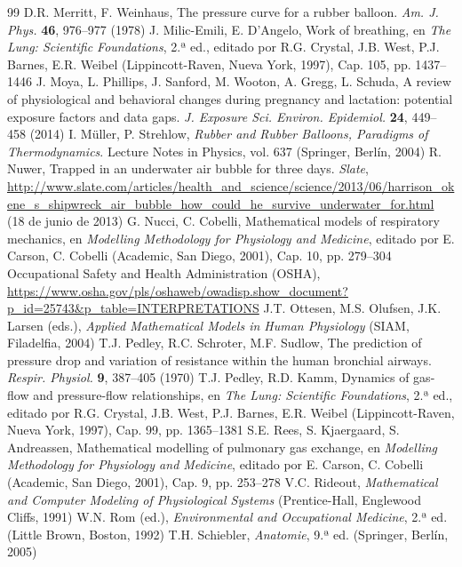 \documentclass[12pt]{book}
\begin{document}
\begin{thebibliography}{99}
 D.R. Merritt, F. Weinhaus, The pressure curve for a rubber balloon. \textit{Am. J. Phys.} \textbf{46}, 976--977 (1978)
 J. Milic-Emili, E. D'Angelo, Work of breathing, en \textit{The Lung: Scientific Foundations}, 2.ª ed., editado por R.G. Crystal, J.B. West, P.J. Barnes, E.R. Weibel (Lippincott-Raven, Nueva York, 1997), Cap. 105, pp. 1437--1446
 J. Moya, L. Phillips, J. Sanford, M. Wooton, A. Gregg, L. Schuda, A review of physiological and behavioral changes during pregnancy and lactation: potential exposure factors and data gaps. \textit{J. Exposure Sci. Environ. Epidemiol.} \textbf{24}, 449--458 (2014)
 I. Müller, P. Strehlow, \textit{Rubber and Rubber Balloons, Paradigms of Thermodynamics}. Lecture Notes in Physics, vol. 637 (Springer, Berlín, 2004)
 R. Nuwer, Trapped in an underwater air bubble for three days. \textit{Slate}, \url{http://www.slate.com/articles/health_and_science/science/2013/06/harrison_okene_s_shipwreck_air_bubble_how_could_he_survive_underwater_for.html} (18 de junio de 2013)
 G. Nucci, C. Cobelli, Mathematical models of respiratory mechanics, en \textit{Modelling Methodology for Physiology and Medicine}, editado por E. Carson, C. Cobelli (Academic, San Diego, 2001), Cap. 10, pp. 279--304
 Occupational Safety and Health Administration (OSHA), \url{https://www.osha.gov/pls/oshaweb/owadisp.show_document?p_id=25743&p_table=INTERPRETATIONS}
 J.T. Ottesen, M.S. Olufsen, J.K. Larsen (eds.), \textit{Applied Mathematical Models in Human Physiology} (SIAM, Filadelfia, 2004)
 T.J. Pedley, R.C. Schroter, M.F. Sudlow, The prediction of pressure drop and variation of resistance within the human bronchial airways. \textit{Respir. Physiol.} \textbf{9}, 387--405 (1970)
 T.J. Pedley, R.D. Kamm, Dynamics of gas-flow and pressure-flow relationships, en \textit{The Lung: Scientific Foundations}, 2.ª ed., editado por R.G. Crystal, J.B. West, P.J. Barnes, E.R. Weibel (Lippincott-Raven, Nueva York, 1997), Cap. 99, pp. 1365--1381
 S.E. Rees, S. Kjaergaard, S. Andreassen, Mathematical modelling of pulmonary gas exchange, en \textit{Modelling Methodology for Physiology and Medicine}, editado por E. Carson, C. Cobelli (Academic, San Diego, 2001), Cap. 9, pp. 253--278
 V.C. Rideout, \textit{Mathematical and Computer Modeling of Physiological Systems} (Prentice-Hall, Englewood Cliffs, 1991)
 W.N. Rom (ed.), \textit{Environmental and Occupational Medicine}, 2.ª ed. (Little Brown, Boston, 1992)
 T.H. Schiebler, \textit{Anatomie}, 9.ª ed. (Springer, Berlín, 2005)

\end{thebibliography}
\end{document}
